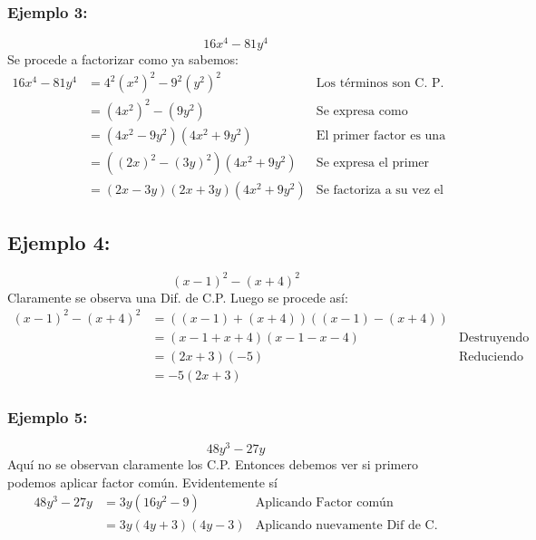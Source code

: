 \documentclass[10pt,twoside]{article}
\begin{document}
\subsubsection*{Ejemplo 3:} 
\[16x^{4}-81y^{4}\]
Se procede a factorizar como ya sabemos:
\begin{align*}
16x^{4}-81y^{4}&=4^{2}(x^{2})^{2}-9^{2}(y^{2})^{2} & \mbox{Los términos son C. P.}\\
&=(4x^{2})^{2}-(9y^{2}) & \mbox{Se expresa como diferencia de C.P.}\\
&=(4x^{2}-9y^{2})(4x^{2}+9y^{2}) & \mbox{El primer factor es una Dif. de C.P.}\\
&=\left((2x)^{2}-(3y)^{2}\right)(4x^{2}+9y^{2}) & \mbox{Se expresa el primer factor como una D. de C.P.}\\
&=(2x-3y)(2x+3y)(4x^{2}+9y^{2}) & \mbox{Se factoriza a su vez el 1er factor}
\end{align*}
\subsection*{Ejemplo 4:}
\[(x-1)^{2}-(x+4)^{2}\]
Claramente se observa una Dif. de C.P. Luego se procede así:
\begin{align*}
(x-1)^{2}-(x+4)^{2}&=\left((x-1)+(x+4)\right)\left((x-1)-(x+4)\right)\\
&=(x-1+x+4)(x-1-x-4) & \mbox{Destruyendo los paréntesis internos}\\
&=(2x+3)(-5) & \mbox{Reduciendo términos semejantes}\\
&=-5(2x+3)
\end{align*}
\subsubsection*{Ejemplo 5:}
\[48y^{3}-27y\]
Aquí no se observan claramente los C.P. Entonces debemos ver si primero podemos aplicar factor común. Evidentemente sí
\begin{align*}
48y^{3}-27y&=3y(16y^{2}-9) & \mbox{Aplicando Factor común}\\
&=3y(4y+3)(4y-3) & \mbox{Aplicando nuevamente Dif de C.}
\end{align*}
\end{document}
